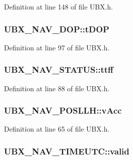 Definition at line 148 of file U\-B\-X.\-h.

\hypertarget{group___g_s_p_module_ga12bd31e6a5d13f568b90a13f3888c694}{
\subsubsection[{t\-D\-O\-P}]{ U\-B\-X\-\_\-\-N\-A\-V\-\_\-\-D\-O\-P\-::t\-D\-O\-P}}\label{group___g_s_p_module_ga12bd31e6a5d13f568b90a13f3888c694}


Definition at line 97 of file U\-B\-X.\-h.

\hypertarget{group___g_s_p_module_ga9810462abcdcce5e305e41d4d6526699}{
\subsubsection[{ttff}]{ U\-B\-X\-\_\-\-N\-A\-V\-\_\-\-S\-T\-A\-T\-U\-S\-::ttff}}\label{group___g_s_p_module_ga9810462abcdcce5e305e41d4d6526699}


Definition at line 88 of file U\-B\-X.\-h.

\hypertarget{group___g_s_p_module_gacd74a5379c0196b551432578f7ef6e4f}{
\subsubsection[{v\-Acc}]{ U\-B\-X\-\_\-\-N\-A\-V\-\_\-\-P\-O\-S\-L\-L\-H\-::v\-Acc}}\label{group___g_s_p_module_gacd74a5379c0196b551432578f7ef6e4f}


Definition at line 65 of file U\-B\-X.\-h.

\hypertarget{group___g_s_p_module_ga7709acce4beceb6a24a8f239923fb026}{
\subsubsection[{valid}]{ U\-B\-X\-\_\-\-N\-A\-V\-\_\-\-T\-I\-M\-E\-U\-T\-C\-::valid}}\label{group___g_s_p_module_ga7709acce4beceb6a24a8f239923fb026}


